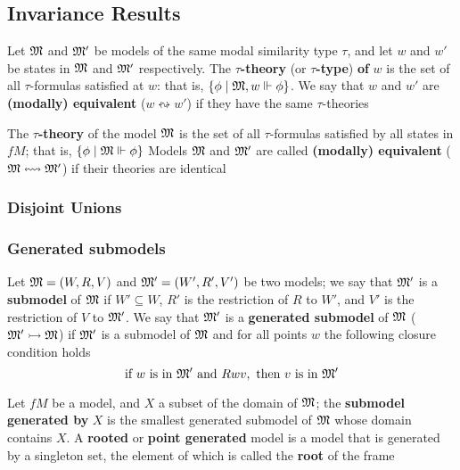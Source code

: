 \documentclass[11pt]{article}
\begin{document}
\subsection{Invariance Results}
\label{sec:orgd81e6b6}
\begin{definition}[]
Let \(\mathfrak{M}\) and \(\mathfrak{M}'\) be models of the same modal similarity type \(\tau\), and
let \(w\) and \(w'\) be states in \(\mathfrak{M}\) and \(\mathfrak{M}'\) respectively. The
\textbf{\(\tau\)-theory} (or \textbf{\(\tau\)-type}) \textbf{of} \(w\) is the set of all
\(\tau\)-formulas satisfied at \(w\): that is,
\(\{\phi\mid\mathfrak{M},w\Vdash\phi\}\). We say that \(w\) and \(w'\) are \textbf{(modally)
equivalent} (\(w\leftrightsquigarrow w'\)) if they have the same \(\tau\)-theories

The \textbf{\(\tau\)-theory} of the model \(\mathfrak{M}\) is the set of all \(\tau\)-formulas
satisfied by all states in \(fM\); that is, \(\{\phi\mid\mathfrak{M}\Vdash\phi\}\)
Models \(\mathfrak{M}\) and \(\mathfrak{M}'\) are called
\textbf{(modally) equivalent} (\(\mathfrak{M}\leftrightsquigarrow\mathfrak{M}'\)) if their theories are identical
\end{definition}

\subsubsection{Disjoint Unions}
\label{sec:orgd3f5806}
\subsubsection{Generated submodels}
\label{sec:org8feb074}
\begin{definition}[]
Let \(\mathfrak{M}=(W,R,V)\) and \(\mathfrak{M}'=(W',R',V')\) be two models; we say that
\(\mathfrak{M}'\) is a \textbf{submodel} of \(\mathfrak{M}\) if \(W'\subseteq W\), \(R'\) is the
restriction of \(R\) to \(W'\), and \(V'\) is the restriction of \(V\) to
\(\mathfrak{M}'\). We say that \(\mathfrak{M}'\) is a \textbf{generated submodel} of \(\mathfrak{M}\)
(\(\mathfrak{M}'\rightarrowtail\mathfrak{M}\)) if \(\mathfrak{M}'\) is a submodel of \(\mathfrak{M}\) and for
all points \(w\) the following closure condition holds
\begin{equation*}
\text{if }w\text{ is in }\mathfrak{M}'\text{ and }Rwv,\text{ then }v\text{ is in }\mathfrak{M}'
\end{equation*}

Let \(fM\) be a model, and \(X\) a subset of the domain of \(\mathfrak{M}\); the
\textbf{submodel generated by} \(X\) is the smallest generated submodel of \(\mathfrak{M}\)
whose domain contains \(X\). A \textbf{rooted} or \textbf{point generated} model is a model
that is generated by a singleton set, the element of which is called the
\textbf{root} of the frame
\end{definition}
\end{document}
